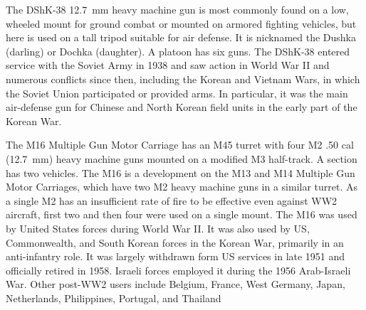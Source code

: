 The DShK-38 12.7~mm heavy machine gun is most commonly found on a low, wheeled mount for ground combat or mounted on armored fighting vehicles, but here is used on a tall tripod suitable for air defense. It is nicknamed the Dushka (darling) or Dochka (daughter). A platoon has six guns.
The DShK-38 entered service with the Soviet Army in 1938 and saw action in World War II and numerous conflicts since then, including the Korean and Vietnam Wars, in which the Soviet Union participated or provided arms. In particular, it was the main air-defense gun for Chinese and North Korean field units in the early part of the Korean War.%


The M16 Multiple Gun Motor Carriage has an M45 turret with four M2 .50 cal (12.7~mm) heavy machine guns mounted on a modified M3 half-track. A section has two vehicles. The M16 is a development on the M13 and M14 Multiple Gun Motor Carriages, which have two M2 heavy machine guns in a similar turret. As a single M2 has an insufficient rate of fire to be effective even against WW2 aircraft, first two and then four were used on a single mount.
The M16 was used by United States forces during World War II. It was also used by US, Commonwealth, and South Korean forces in the Korean War, primarily in an anti-infantry role. It was largely withdrawn form US services in late 1951 and officially retired in 1958. Israeli forces employed it during the 1956 Arab-Israeli War. Other post-WW2 users include Belgium, France, West Germany, Japan, Netherlands, Philippines, Portugal, and Thailand%

